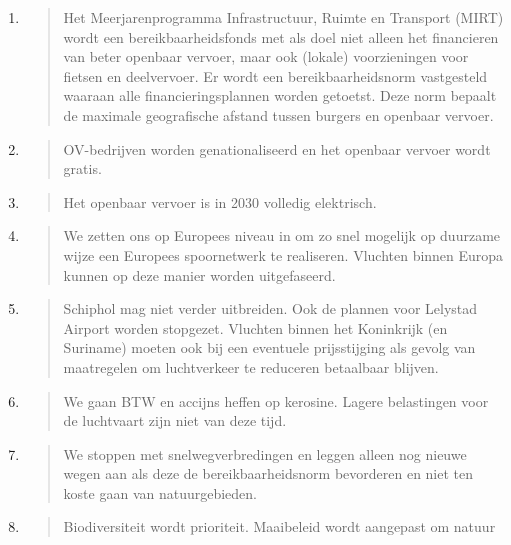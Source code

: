 \begin{enumerate}
\def\labelenumi{\arabic{enumi}.}
\item
  \begin{quote}
  Het Meerjarenprogramma Infrastructuur, Ruimte en Transport (MIRT)
  wordt een bereikbaarheidsfonds met als doel niet alleen het
  financieren van beter openbaar vervoer, maar ook (lokale)
  voorzieningen voor fietsen en deelvervoer. Er wordt een
  bereikbaarheidsnorm vastgesteld waaraan alle financieringsplannen
  worden getoetst. Deze norm bepaalt de maximale geografische afstand
  tussen burgers en openbaar vervoer.
  \end{quote}
\item
  \begin{quote}
  OV-bedrijven worden genationaliseerd en het openbaar vervoer wordt
  gratis.
  \end{quote}
\item
  \begin{quote}
  Het openbaar vervoer is in 2030 volledig elektrisch.
  \end{quote}
\item
  \begin{quote}
  We zetten ons op Europees niveau in om zo snel mogelijk op duurzame
  wijze een Europees spoornetwerk te realiseren. Vluchten binnen Europa
  kunnen op deze manier worden uitgefaseerd.
  \end{quote}
\item
  \begin{quote}
  Schiphol mag niet verder uitbreiden. Ook de plannen voor Lelystad
  Airport worden stopgezet. Vluchten binnen het Koninkrijk (en Suriname)
  moeten ook bij een eventuele prijsstijging als gevolg van maatregelen
  om luchtverkeer te reduceren betaalbaar blijven.
  \end{quote}
\item
  \begin{quote}
  We gaan BTW en accijns heffen op kerosine. Lagere belastingen voor de
  luchtvaart zijn niet van deze tijd.
  \end{quote}
\item
  \begin{quote}
  We stoppen met snelwegverbredingen en leggen alleen nog nieuwe wegen
  aan als deze de bereikbaarheidsnorm bevorderen en niet ten koste gaan
  van natuurgebieden.
  \end{quote}
\item
  \begin{quote}
  Biodiversiteit wordt prioriteit. Maaibeleid wordt aangepast om natuur

\end{quote}
\end{enumerate}
